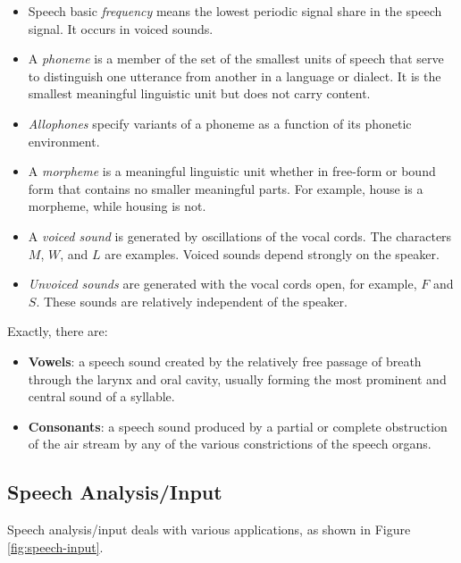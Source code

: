 \begin{itemize}
	\item Speech basic \textit{frequency} means the lowest periodic signal share in the speech
	signal. It occurs in voiced sounds.
	
	\item A \textit{phoneme} is a member of the set of the smallest units of speech that serve to distinguish one utterance from another in a language or dialect. It is the smallest
	meaningful linguistic unit but does not carry content.
	
	\item \textit{Allophones} specify variants of a phoneme as a function of its phonetic environment.
	
	\item A \textit{morpheme} is a meaningful linguistic unit whether in free-form or bound form that contains no smaller meaningful parts. For example, house is a morpheme, while housing is not.
	
	\item A \textit{voiced sound} is generated by oscillations of the vocal cords. The characters $ M $,
	$ W $, and $ L $ are examples. Voiced sounds depend strongly on the speaker.
	
	\item \textit{Unvoiced sounds} are generated with the vocal cords open, for example, $ F $ and $ S $.
	These sounds are relatively independent of the speaker.
\end{itemize}

\noindent Exactly, there are:

\begin{itemize}
	\item \textbf{Vowels}: a speech sound created by the relatively free passage of breath
	through the larynx and oral cavity, usually forming the most prominent
	and central sound of a syllable.
	\item \textbf{Consonants}:  a speech sound produced by a partial or complete
	obstruction of the air stream by any of the various constrictions of the
	speech organs.
\end{itemize}

\subsection[Analysis]{Speech Analysis/Input}
Speech analysis/input deals with various applications, as shown in Figure {\ref{fig:speech-input}}.

